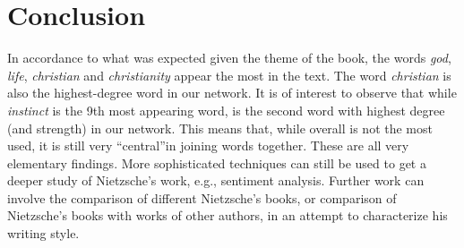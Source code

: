 \documentclass[letterpaper, 10 pt, conference]{article}
\begin{document}
\section{Conclusion}
In accordance to what was expected given the theme of the book, the words \textit{god}, \textit{life}, \textit{christian} and \textit{christianity} appear the most in the text. The word \textit{christian} is also the highest-degree word in our network. It is of interest to observe that while \textit{instinct} is the 9th most appearing word, is the second word with highest degree (and strength) in our network. This means that, while overall is not the most used, it is still very \textquotedblleft central\textquotedblright in joining words together. These are all very elementary findings. More sophisticated techniques can still be used to get a deeper study of Nietzsche's work, e.g., sentiment analysis. Further work can involve the comparison of different Nietzsche's books, or comparison of Nietzsche's books with works of other authors, in an attempt to characterize his writing style.

\appendix
\end{document}
